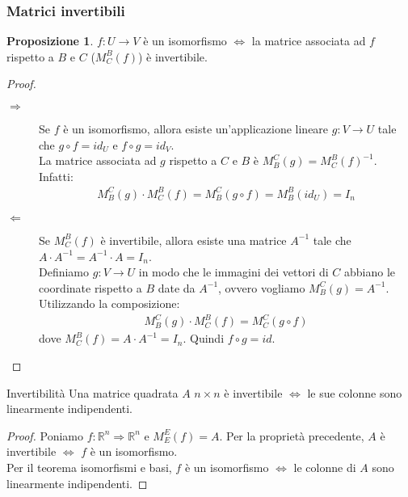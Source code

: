 \documentclass[a4paper]{article}
\theoremstyle{definition}
\newtheorem*{prop}{Proposizione}
\begin{document}
\subsubsection{Matrici invertibili}
\begin{prop}
	$f: U \rightarrow V$ è un isomorfismo $\Leftrightarrow$ la matrice associata ad $f$ rispetto a $B$ e $C$ ($M_C^B(f)$) è invertibile.
\end{prop}
\begin{proof} \
	\begin{description}
		\item[$\Rightarrow$] Se $f$ è un isomorfismo, allora esiste un'applicazione lineare $g: V \rightarrow U$ tale che $g \circ f = id_U$ e $f \circ g = id_V$. \\
		La matrice associata ad $g$ rispetto a $C$ e $B$ è $M_B^C(g) = M_C^B(f)^{-1}$. \\
		Infatti:
		\begin{align*}
			M_B^C(g) \cdot M_C^B(f) = M_B^C(g \circ f) = M_B^B(id_U) = I_n
		\end{align*}
		\item[$\Leftarrow$] Se $M_C^B(f)$ è invertibile, allora esiste una matrice $A^{-1}$ tale che $A \cdot A^{-1} = A^{-1} \cdot A = I_n$. \\
		Definiamo $g: V \rightarrow U$ in modo che le immagini dei vettori di $C$ abbiano le coordinate rispetto a $B$ date da $A^{-1}$,
		ovvero vogliamo $M_B^C(g) = A^{-1}$. \\
		Utilizzando la composizione:
		\begin{align*}
			M_B^C(g) \cdot M_C^B(f) = M_C^C(g \circ f)
		\end{align*}
		dove $M_C^B(f) = A \cdot A^{-1} = I_n$.
		Quindi $f \circ g = id$.
	\end{description}
\end{proof}


\begin{teo}{Invertibilità}{}
	Una matrice quadrata $A$ $n \times n$ è invertibile $\Leftrightarrow$ le sue colonne sono linearmente indipendenti.
\end{teo}
\begin{proof}
	Poniamo $f: \mathbb{R}^n \Rightarrow \mathbb{R}^n$ e $M_E^E(f) = A$.
	Per la proprietà precedente, $A$ è invertibile $\Leftrightarrow$ $f$ è un isomorfismo. \\
	Per il teorema isomorfismi e basi, $f$ è un isomorfismo $\Leftrightarrow$ le colonne di $A$ sono linearmente indipendenti.
\end{proof}
\end{document}
